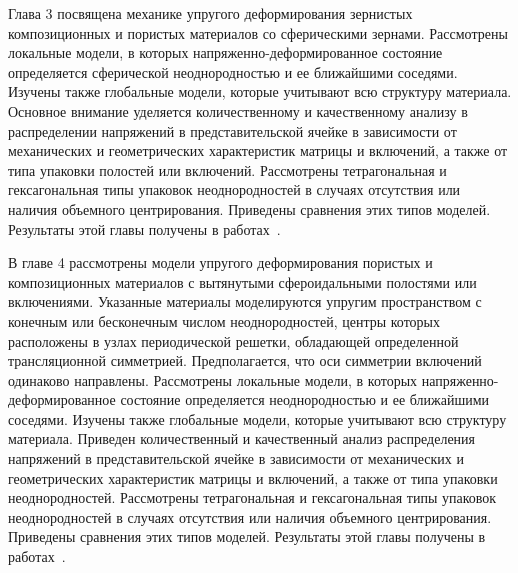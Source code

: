 Глава 3 посвящена механике упругого деформирования зернистых композиционных и пористых материалов со сферическими зернами. Рассмотрены локальные модели, в которых напряженно-деформированное состояние определяется сферической неоднородностью и ее ближайшими соседями. Изучены также глобальные модели, которые учитывают всю структуру материала. Основное внимание уделяется количественному и качественному анализу в распределении напряжений в представительской ячейке в зависимости от механических и геометрических характеристик матрицы и включений, а также от типа упаковки полостей или включений. Рассмотрены тетрагональная и гексагональная типы упаковок неоднородностей в случаях отсутствия или наличия объемного центрирования.
Приведены сравнения этих типов моделей. Результаты этой главы получены в работах~\cite{Nikolaev2012, Nikolaev2014-2, Nikolaev2014-5, Nikolaev2014-7}.

В главе 4 рассмотрены модели упругого деформирования пористых и композиционных материалов с вытянутыми сфероидальными полостями или включениями. Указанные материалы моделируются упругим пространством с конечным или бесконечным числом неоднородностей, центры которых расположены в узлах периодической решетки, обладающей определенной трансляционной симметрией. Предполагается, что оси симметрии включений одинаково направлены. Рассмотрены локальные модели, в которых на\-пряжен\-но-де\-форми\-ро\-ван\-ное состояние определяется неоднородностью и ее ближайшими соседями. Изучены также глобальные модели, которые учитывают всю структуру материала. Приведен количественный и качественный анализ распределения напряжений в представительской ячейке в зависимости от механических и геометрических характеристик матрицы и включений, а также от типа упаковки неоднородностей. Рассмотрены тетрагональная и гексагональная типы упаковок неоднородностей в случаях отсутствия или наличия объемного центрирования.
Приведены сравнения этих типов моделей. Результаты этой главы получены в работах~\cite{Nikolaev2010, Nikolaev-Tanchik2012, Nikolaev2013, Nikolaev2014-1, Nikolaev2014-9, Nikolaev2014-3, Nikolaev2014-4, Nikolaev2014-6}.

%
 
